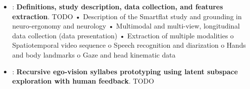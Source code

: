 \begin{itemize}
    \item \textbf{}: \textbf{Definitions, study description, data collection, and features extraction}.     
   TODO
        •	Description of the Smartflat study and grounding in neuro-ergonomy and neurology
        •	Multimodal and multi-view, longitudinal data collection (data presentation)
        •	Extraction of multiple modalities
        o	Spatiotemporal video sequence
        o	Speech recognition and diarization
        o	Hands and body landmarks
        o	Gaze and head kinematic data 
        



    
    \item \textbf{}: \textbf{Recursive ego-vision syllabes prototyping using latent subspace exploration with human feedback}. TODO


    


\end{itemize}
